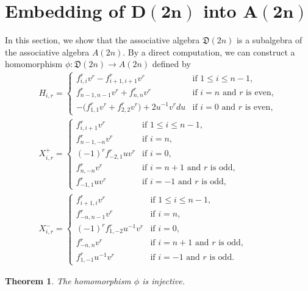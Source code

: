 \documentclass[10pt,a4paper]{amsart}
\numberwithin{equation}{section}
\newtheorem{Theorem}{Theorem}[section]
\theoremstyle{definition}
\begin{document}
\section[Embedding of D(2n) into A(2n)]{Embedding of $\boldsymbol{D(2n)}$ into $\boldsymbol{A(2n)}$}\label{sec:6}
In this section, we show that the associative algebra $\mathfrak{D}(2n)$ is a subalgebra of the associative algebra $A(2n)$.
By a direct computation, we can construct a homomorphism
$\phi\colon \mathfrak{D}(2n)\to A(2n)$
defined by
\begin{gather*}
H_{i,r}=\begin{cases}
f^r_{i,i}v^r-f^r_{i+1,i+1}v^r&\text{if }1\leq i\leq n-1,\\
f^r_{n-1,n-1}v^r+f^r_{n,n}v^r&\text{if }i=n\text{ and $r$ is even},\\
-\bigl(f^r_{1,1}v^r+f^r_{2,2}v^r\bigr)+2u^{-1}v^{r}du&\text{if }i=0\text{ and $r$ is even},
\end{cases}\\
X^+_{i,r}=\begin{cases}
f^r_{i,i+1}v^r&\text{if }1\leq i\leq n-1,\\
f^r_{n-1,-n}v^r&\text{if }i=n,\\
(-1)^rf^r_{-2,1}uv^r&\text{if }i=0,\\
f^r_{n,-n}v^r&\text{if }i=n+1\text{ and $r$ is odd},\\
f^r_{-1,1}uv^r&\text{if }i=-1\text{ and $r$ is odd},
\end{cases}\\
X^-_{i,r}=\begin{cases}
f^r_{i+1,i}v^r&\text{if }1\leq i\leq n-1,\\
f^r_{-n,n-1}v^r&\text{if }i=n,\\
(-1)^rf^r_{1,-2}u^{-1}v^r&\text{if }i=0,\\
f^r_{-n,n}v^r&\text{if }i=n+1\text{ and $r$ is odd},\\
f^r_{1,-1}u^{-1}v^r&\text{if }i=-1\text{ and $r$ is odd}.
\end{cases}
\end{gather*}

\begin{Theorem}\label{inj}
The homomorphism $\phi$ is injective.
\end{Theorem}
\end{document}
